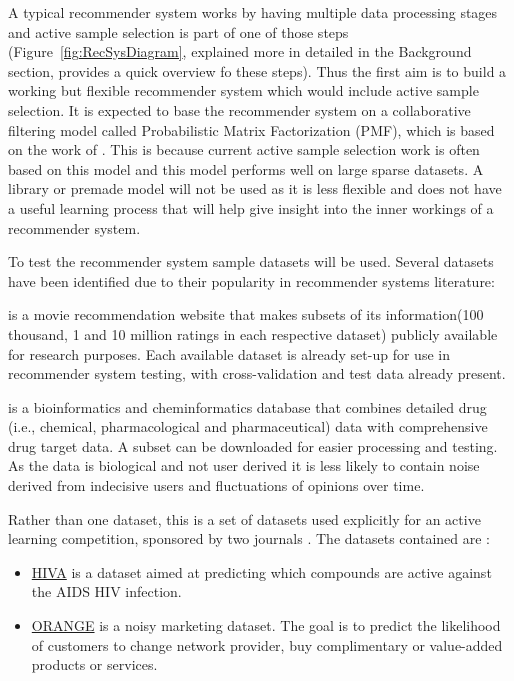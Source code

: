 A typical recommender system works by having multiple data processing stages and active sample selection is part of one of those steps (Figure~\ref*{fig:RecSysDiagram}, explained more in detailed in the Background section, provides a quick overview fo these steps). Thus the first aim is to build a working but flexible recommender system which would include active sample selection. It is expected to base the recommender system on a collaborative filtering model called Probabilistic Matrix Factorization (PMF), which is based on the work of \cite{pmf}. This is because current active sample selection work is often based on this model and this model performs well on large sparse datasets. A library or premade model will not be used as it is less flexible and does not have a useful learning process that will help give insight into the inner workings of a recommender system.

To test the recommender system sample datasets will be used. Several datasets have been identified due to their popularity in recommender systems literature:
\begin{description}[style=standard,leftmargin=.7cm,font=\bfseries]
  \item[MovieLens] is a movie recommendation website that makes subsets of its information(100 thousand, 1 and 10 million ratings in each respective dataset) publicly available for research purposes. Each available dataset is already set-up for use in recommender system testing, with cross-validation and test data already present.
  \item[DrugBank] is a bioinformatics and cheminformatics database that combines detailed drug (i.e., chemical, pharmacological and pharmaceutical) data with comprehensive drug target data. A subset can be downloaded for easier processing and testing. As the data is biological and not user derived it is less likely to contain noise derived from indecisive users and fluctuations of opinions over time.
  \item[Active Learning Challenge] Rather than one dataset, this is a set of datasets used explicitly for an active learning competition, sponsored by two journals \cite{al-chall}. The datasets contained are :
  \begin{itemize}
  \item \underline{HIVA} is a dataset aimed at predicting which compounds are active against the AIDS HIV infection.
  \item \underline{ORANGE} is a noisy marketing dataset. The goal is to predict the likelihood of customers to change network provider, buy complimentary or value-added products or services. 
  \end{itemize}
\end{description}

